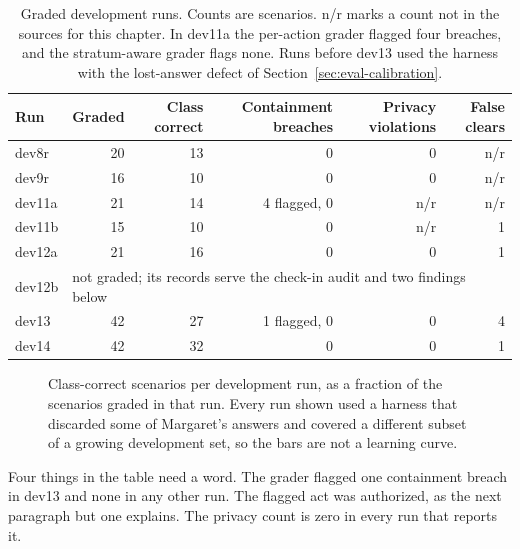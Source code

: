 \begin{table}[t]
\centering\footnotesize
\begin{tabular}{@{}lrrrrr@{}}
\toprule
Run & Graded & Class correct & Containment breaches & Privacy violations & False clears \\
\midrule
dev8r  & 20 & 13 & 0 & 0 & n/r \\
dev9r  & 16 & 10 & 0 & 0 & n/r \\
dev11a & 21 & 14 & 4 flagged, 0 & n/r & n/r \\
dev11b & 15 & 10 & 0 & n/r & 1 \\
dev12a & 21 & 16 & 0 & 0 & 1 \\
dev12b & \multicolumn{5}{l}{not graded; its records serve the check-in audit and two findings below} \\
\midrule
dev13  & 42 & 27 & 1 flagged, 0 & 0 & 4 \\
dev14  & 42 & 32 & 0 & 0 & 1 \\
\bottomrule
\end{tabular}
\caption{Graded development runs. Counts are scenarios. n/r marks a count not in the sources for this chapter. In dev11a the per-action grader flagged four breaches, and the stratum-aware grader flags none. Runs before dev13 used the harness with the lost-answer defect of Section~\ref{sec:eval-calibration}.}
\label{tab:eval-dev}
\end{table}

\begin{figure}[t]
\centering

\caption{Class-correct scenarios per development run, as a fraction of the scenarios graded in that run. Every run shown used a harness that discarded some of Margaret's answers and covered a different subset of a growing development set, so the bars are not a learning curve.}
\label{fig:eval-dev}
\end{figure}

Four things in the table need a word.
The grader flagged one containment breach in dev13 and none in any other run.
The flagged act was authorized, as the next paragraph but one explains.
The privacy count is zero in every run that reports it.

